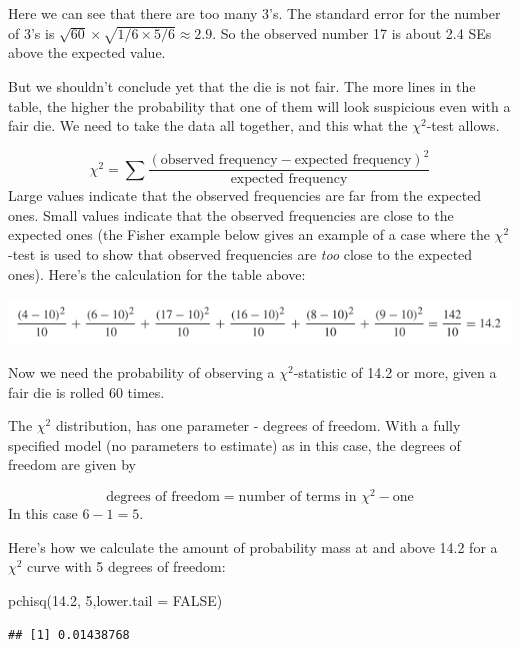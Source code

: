 \documentclass[
]{book}
\newenvironment{Shaded}{\begin{snugshade}}{\end{snugshade}}
\newcommand{\AttributeTok}[1]{\textcolor[rgb]{0.77,0.63,0.00}{#1}}
\newcommand{\ConstantTok}[1]{\textcolor[rgb]{0.00,0.00,0.00}{#1}}
\newcommand{\DecValTok}[1]{\textcolor[rgb]{0.00,0.00,0.81}{#1}}
\newcommand{\FloatTok}[1]{\textcolor[rgb]{0.00,0.00,0.81}{#1}}
\newcommand{\FunctionTok}[1]{\textcolor[rgb]{0.00,0.00,0.00}{#1}}
\newcommand{\NormalTok}[1]{#1}
\begin{document}
Here we can see that there are too many 3's. The standard error for the number of 3's is \(\sqrt{60} \times \sqrt{1/6 \times 5/6} \approx 2.9\). So the observed number 17 is about 2.4 SEs above the expected value.

But we shouldn't conclude yet that the die is not fair. The more lines in the table, the higher the probability that one of them will look suspicious even with a fair die. We need to take the data all together, and this what the \(\chi^2\)-test allows.

\[
\chi^2 = \sum\frac{(\text{observed frequency} - \text{expected frequency})^2}{\text{expected frequency}}
\]
Large values indicate that the observed frequencies are far from the expected ones. Small values indicate that the observed frequencies are close to the expected ones (the Fisher example below gives an example of a case where the \(\chi^2\)-test is used to show that observed frequencies are \emph{too} close to the expected ones). Here's the calculation for the table above:

\includegraphics{images/Ch28Img02.png}

Now we need the probability of observing a \(\chi^2\)-statistic of 14.2 or more, given a fair die is rolled 60 times.

The \(\chi^2\) distribution, has one parameter - degrees of freedom. With a fully specified model (no parameters to estimate) as in this case, the degrees of freedom are given by

\[
\text{degrees of freedom} = \text{number of terms in } \chi^2 - \text{one}
\]
In this case \(6 - 1 = 5\).

Here's how we calculate the amount of probability mass at and above 14.2 for a \(\chi^2\) curve with 5 degrees of freedom:

\begin{Shaded}
\begin{Highlighting}[]
\FunctionTok{pchisq}\NormalTok{(}\FloatTok{14.2}\NormalTok{, }\DecValTok{5}\NormalTok{,}\AttributeTok{lower.tail =} \ConstantTok{FALSE}\NormalTok{)}
\end{Highlighting}
\end{Shaded}

\begin{verbatim}
## [1] 0.01438768
\end{verbatim}
\end{document}
